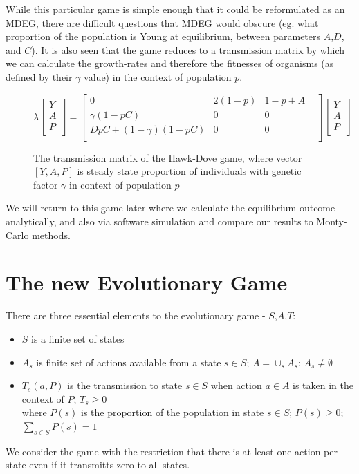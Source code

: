 \documentclass[journal,article,accept,oneauthors,pdftex,10pt,a4paper]{mdpi}
\begin{document}
While this particular game is simple enough that it could be reformulated as an MDEG, there are difficult questions that MDEG would obscure (eg. what proportion of the population is Young at equilibrium, between parameters $A$,$D$, and $C$).
It is also seen that the game reduces to a transmission matrix by which we can calculate the growth-rates and therefore the fitnesses of organisms (as defined by their $\gamma$ value) in the context of population $p$.
\begin{figure}[H]
$$ \lambda \begin{bmatrix}
    Y \\
    A \\
    P \\
\end{bmatrix} = \begin{bmatrix}
    0 & 2(1-p) & 1-p+A & \\
    \gamma(1-pC) & 0 & 0  & \\
     DpC+(1-\gamma)(1-pC)  & 0 & 0  & \\
\end{bmatrix}\begin{bmatrix}
    Y \\
    A \\
    P \\
\end{bmatrix} $$
\caption{The transmission matrix of the Hawk-Dove game, where vector $[Y,A,P]$ is steady state proportion of individuals with genetic factor $\gamma$ in context of population $p$}
\end{figure}
We will return to this game later where we calculate the equilibrium outcome analytically, and also via software simulation and compare our results to Monty-Carlo methods.

\section{The new Evolutionary Game}

There are three essential elements to the evolutionary game - $S$,$A$,$T$:
\begin{itemize}[leftmargin=*,labelsep=4mm]
\item	$S$ is a finite set of states
\item	$A_s$ is finite set of actions available from a state $s\in S$; $A=\cup_s A_s$; $A_s \ne \emptyset$
\item	$T_s(a,P)$ is the transmission to state $s\in S$ when action $a\in A$ is taken in the context of $P$; $T_s\ge 0$\\ where $P(s)$ is the proportion of the population in state $s\in S$; $P(s)\ge 0$; $\sum_{s\in S}P(s)=1$
\end{itemize}
We consider the game with the restriction that there is at-least one action per state even if it transmitts zero to all states.
\end{document}
